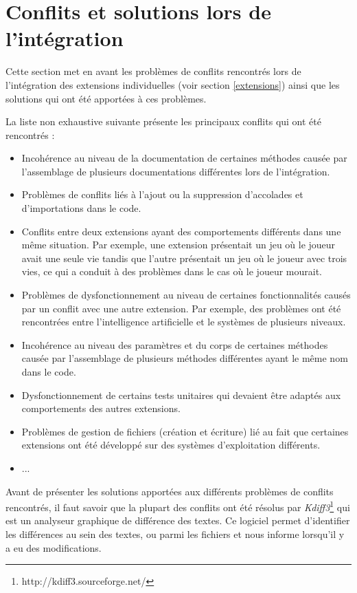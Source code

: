 \documentclass[12pt, openany]{report}
\begin{document}
\section{Conflits et solutions lors de l'intégration}

Cette section met en avant les problèmes de conflits rencontrés lors de l'intégration des extensions individuelles (voir section \ref{extensions}) ainsi que les solutions qui ont été apportées à ces problèmes.

La liste non exhaustive suivante présente les principaux conflits qui ont été rencontrés :\\
\begin{itemize}
\item Incohérence au niveau de la documentation de certaines méthodes causée par l'assemblage de plusieurs documentations différentes lors de l'intégration.

\item Problèmes de conflits liés à l'ajout ou la suppression d'accolades et d'importations dans le code.

\item Conflits entre deux extensions ayant des comportements différents dans une même situation. Par exemple, une extension présentait un jeu où le joueur avait une seule vie tandis que l'autre présentait un jeu où le joueur avec trois vies, ce qui a conduit à des problèmes dans le cas où le joueur mourait.

\item Problèmes de dysfonctionnement au niveau de certaines fonctionnalités causés par un conflit avec une autre extension. Par exemple, des problèmes ont été rencontrées entre l'intelligence artificielle et le systèmes de plusieurs niveaux.

\item Incohérence au niveau des paramètres et du corps de certaines méthodes causée par l'assemblage de plusieurs méthodes différentes ayant le même nom dans le code.

\item Dysfonctionnement de certains tests unitaires qui devaient être adaptés aux comportements des autres extensions.
\item Problèmes de gestion de fichiers (création et écriture) lié au fait que certaines extensions ont été développé sur des systèmes d'exploitation différents.
\item ...
\end{itemize}

Avant de présenter les solutions apportées aux différents problèmes de conflits rencontrés, il faut savoir que la plupart des conflits ont été résolus par \textit{Kdiff3}\footnote{http://kdiff3.sourceforge.net/} qui est un analyseur graphique de différence des textes. Ce logiciel permet d'identifier les différences au sein des textes, ou parmi les fichiers et  nous informe lorsqu'il y a eu des modifications.
\end{document}
